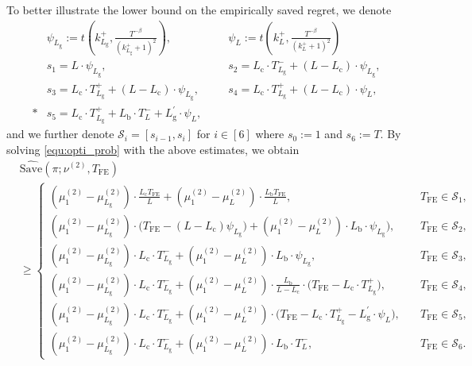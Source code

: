 \documentclass[twoside,11pt]{article}
\newcommand{\calS}{\mathcal{S}}
\newcommand{\rmb}{\mathrm{b}}
\newcommand{\rmc}{\mathrm{c}}
\newcommand{\rmg}{\mathrm{g}}
\newcommand{\Tfe}{T_{\mathrm{FE}}}
\newcommand{\Saved}{\mathrm{Save}}
\begin{document}
To better illustrate the lower bound on the empirically saved regret, we denote
\begin{align}
    &\psi_{L_{\rmg}} := t\left(k_{L_{\rmg}}^+,\frac{T^{-\beta}}{(k_{L_{\rmg}}^+ +1)^2}\right), \quad &&\psi_{L}:=t\left(k_{L}^+,\frac{T^{-\beta}}{(k_{L}^+ +1)^2}\right) \\
        &s_1 = L\cdot \psi_{L_{\rmg}},
        &&s_2 = L_{\rmc}\cdot T_{L_{\rmg}}^- + (L-L_{\rmc}) \cdot \psi_{L_{\rmg}},\\
        &s_3 = L_{\rmc}\cdot T_{L_{\rmg}}^+ + (L-L_{\rmc}) \cdot \psi_{L_{\rmg}},\quad
        &&s_4 = L_{\rmc}\cdot T_{L_{\rmg}}^+ + (L-L_{\rmc})\cdot \psi_{L},\\*
        &s_5 = L_{\rmc}\cdot T_{L_{\rmg}}^+ + L_{\rmb}\cdot T_L^- + L_{\rmg}^\prime\cdot \psi_{L},
\end{align}
and we further denote $\calS_i=[s_{i-1},s_i]$ for $i\in[6]$ where $s_0:=1$ and $s_6:=T$.
By solving \eqref{equ:opti_prob} with the above estimates, we obtain
\begin{align}
    &\widehat{\Saved}(\pi;\nu^{(2)},\Tfe)
    \\&
    \geq
    \begin{cases}
        (\mu_{1}^{(2)}-\mu_{L_{\rmg}}^{(2)})\cdot \frac{L_{\rmc}\Tfe}{L}
        +
        (\mu_{1}^{(2)}-\mu_{L}^{(2)})\cdot \frac{L_{\rmb}\Tfe}{L},
            \quad&
            \Tfe\in\calS_1,
        \\
        (\mu_{1}^{(2)}-\mu_{L_{\rmg}}^{(2)})\cdot \Big(\Tfe - (L-L_{\rmc})\psi_{L_{\rmg}} \Big)
        +
        (\mu_{1}^{(2)}-\mu_{L}^{(2)})\cdot L_{\rmb} \cdot \psi_{L_{\rmg}})
        ,
            \quad&
            \Tfe\in\calS_2,
        \\
        (\mu_{1}^{(2)}-\mu_{L_{\rmg}}^{(2)})\cdot L_{\rmc}\cdot T_{L_{\rmg}}^- 
        +
        (\mu_{1}^{(2)}-\mu_{L}^{(2)})\cdot L_{\rmb} \cdot \psi_{L_{\rmg}}
        ,
            \quad&
            \Tfe\in\calS_3,
        \\
        (\mu_{1}^{(2)}-\mu_{L_{\rmg}}^{(2)})\cdot L_{\rmc}\cdot T_{L_{\rmg}}^- 
        +
        (\mu_{1}^{(2)}-\mu_{L}^{(2)})\cdot \frac{L_{\rmb}}{L-L_{\rmc}} \cdot 
        \Big(\Tfe-L_{\rmc}\cdot T_{L_{\rmg}}^+\Big)
        ,
            \quad&
            \Tfe\in\calS_4,
        \\
        (\mu_{1}^{(2)}-\mu_{L_{\rmg}}^{(2)})\cdot L_{\rmc}\cdot T_{L_{\rmg}}^- 
        +
        (\mu_{1}^{(2)}-\mu_{L}^{(2)})\cdot \Big(
            \Tfe- L_{\rmc}\cdot T_{L_{\rmg}}^+ - L_{\rmg}^\prime \cdot   \psi_{L}
            \Big)
        ,
            \quad&
            \Tfe\in\calS_5,
         \\
         (\mu_{1}^{(2)}-\mu_{L_{\rmg}}^{(2)})\cdot L_{\rmc}\cdot T_{L_{\rmg}}^- 
        +
        (\mu_{1}^{(2)}-\mu_{L}^{(2)})\cdot L_{\rmb} \cdot T_{L}^-
        ,
            \quad&
            \Tfe\in\calS_6.
    \end{cases}
\end{align}
\end{document}
